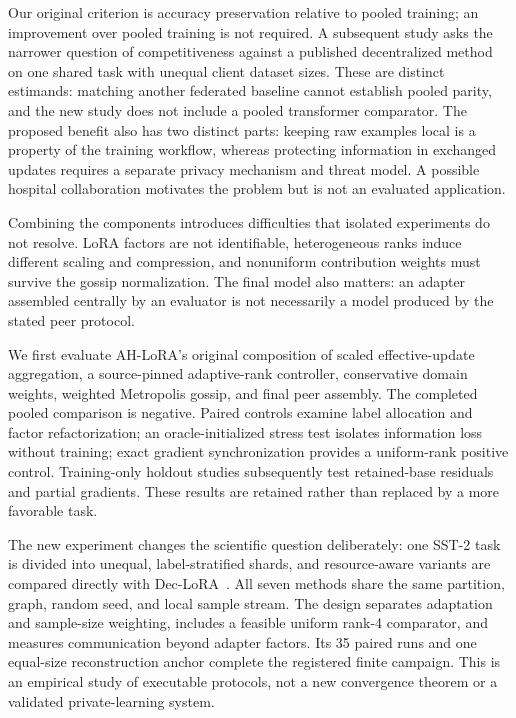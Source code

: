 \documentclass[11pt]{article}
\begin{document}
Our original criterion is accuracy preservation relative to pooled training; an improvement over pooled training is not required. A subsequent study asks the narrower question of competitiveness against a published decentralized method on one shared task with unequal client dataset sizes. These are distinct estimands: matching another federated baseline cannot establish pooled parity, and the new study does not include a pooled transformer comparator. The proposed benefit also has two distinct parts: keeping raw examples local is a property of the training workflow, whereas protecting information in exchanged updates requires a separate privacy mechanism and threat model. A possible hospital collaboration motivates the problem but is not an evaluated application.

Combining the components introduces difficulties that isolated experiments do not resolve. LoRA factors are not identifiable, heterogeneous ranks induce different scaling and compression, and nonuniform contribution weights must survive the gossip normalization. The final model also matters: an adapter assembled centrally by an evaluator is not necessarily a model produced by the stated peer protocol.

We first evaluate AH-LoRA's original composition of scaled effective-update aggregation, a source-pinned adaptive-rank controller, conservative domain weights, weighted Metropolis gossip, and final peer assembly. The completed pooled comparison is negative. Paired controls examine label allocation and factor refactorization; an oracle-initialized stress test isolates information loss without training; exact gradient synchronization provides a uniform-rank positive control. Training-only holdout studies subsequently test retained-base residuals and partial gradients. These results are retained rather than replaced by a more favorable task.

The new experiment changes the scientific question deliberately: one SST-2 task is divided into unequal, label-stratified shards, and resource-aware variants are compared directly with Dec-LoRA~\citep{ghiasvand2025declora}. All seven methods share the same partition, graph, random seed, and local sample stream. The design separates adaptation and sample-size weighting, includes a feasible uniform rank-4 comparator, and measures communication beyond adapter factors. Its 35 paired runs and one equal-size reconstruction anchor complete the registered finite campaign. This is an empirical study of executable protocols, not a new convergence theorem or a validated private-learning system.
\end{document}
